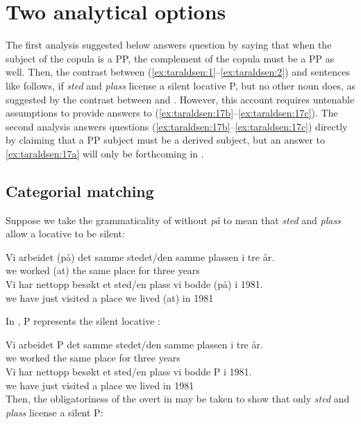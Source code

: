 \documentclass[output=paper]{LSP/langsci}
\begin{document}
\section{Two analytical options}\label{sec:taraldsen:3}

The first analysis suggested below answers question  by saying that when the subject of the copula is a PP, the complement of the copula must be a PP as well. Then, the contrast between (\ref{ex:taraldsen:1}--\ref{ex:taraldsen:2}) and sentences like  follows, if \textit{sted} and \textit{plass} license a silent locative P, but no other noun does, as suggested by the contrast between  and . However, this account requires untenable  assumptions to provide answers to (\ref{ex:taraldsen:17b}--\ref{ex:taraldsen:17c}). The second analysis answers questions (\ref{ex:taraldsen:17b}--\ref{ex:taraldsen:17c}) directly by claiming that a PP subject must be a derived subject, but an answer to \ref{ex:taraldsen:17a} will only be forthcoming in .

\subsection{Categorial matching}\label{sec:taraldsen:3.1}

Suppose we take the grammaticality of  without \textit{på} to mean that \textit{sted} and \textit{plass} allow a locative  to be silent:

\ea%
    \label{ex:taraldsen:18}
    \ea \gll Vi arbeidet (på) {det samme stedet/den samme plassen} i tre år.\\
	     we worked (at)  {the same place}                        for three years\\

    \ex \gll Vi har nettopp besøkt {et sted/en plass} vi bodde (på) i 1981.\\
	     we have just    visited {a  place}             we lived (at)  in 1981\\
    \z
\z

In , P represents the silent locative :

\ea%
    \label{ex:taraldsen:19}
    \ea \gll Vi arbeidet P {det samme stedet/den samme plassen} i tre år.\\
	we worked  {}  {the same place}                        for three years\\
    \ex \gll Vi har nettopp besøkt {et sted/en plass} vi bodde P i 1981.\\
             we have just    visited {a  place}             we lived {}  in 1981\\
\z \z
Then, the obligatoriness of the overt  in   may be taken to show that only \textit{sted} and \textit{plass} license a silent P:
\end{document}
